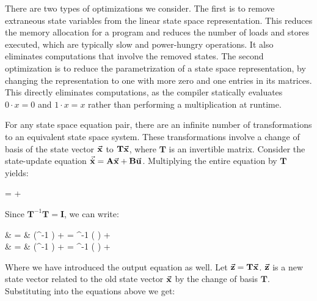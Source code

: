 \label{sec:optimization}

There are two types of optimizations we consider.  The first is to
remove extraneous state variables from the linear state space
representation. This reduces the memory allocation for a program and
reduces the number of loads and stores executed, which are typically
slow and power-hungry operations. It also eliminates computations that
involve the removed states.  The second optimization is to reduce the
parametrization of a state space representation, by changing the
representation to one with more zero and one entries in its
matrices. This directly eliminates computations, as the compiler
statically evaluates $0 \cdot x = 0$ and $1 \cdot x = x$ rather than
performing a multiplication at runtime.


For any state space equation pair, there are an infinite number of
transformations to an equivalent state space system.  These
transformations involve a change of basis of the state vector
$\vec{\mathbf{x}}$ to $\mathbf{T} \vec{\mathbf{x}}$, where
$\mathbf{T}$ is an invertible matrix. Consider the state-update
equation $\vec{\dot{\mathbf{x}}} = \mathbf{A} \vec{\mathbf{x}} +
\mathbf{B} \vec{\mathbf{u}}$. Multiplying the entire equation by
$\mathbf{T}$ yields:
\begin{minipage}{2in}
\vspace{-6pt}
\starteqnstar
{}  =   +
 
\doneeqnstar
\end{minipage}

Since $\mathbf{T}^{-1} \mathbf{T} = \mathbf{I}$, we can write:
\hspace{15pt}
\begin{minipage}{3.5in}
\vspace{12pt}
\starteqnstar
{}  & = & 
(^{-1} )  + 
 = 
^{-1} ( ) +   \\
 & = &  (^{-1} )
 +   = 
^{-1} ( ) + 
\doneeqnstar
\end{minipage}

\bigskip
Where we have introduced the output equation as well. Let
$\vec{\mathbf{z}} = \mathbf{T} \vec{\mathbf{x}}$.
$\vec{\mathbf{z}}$ is a new state vector related to the old state
vector $\vec{\mathbf{x}}$ by the change of basis $\mathbf{T}$.
Substituting into the equations above we get:

